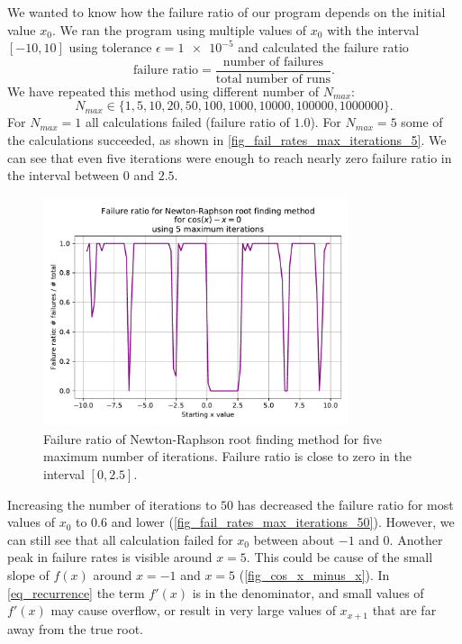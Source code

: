 We wanted to know how the failure ratio of our program depends on the initial value $x_0$. We ran the program using multiple values of $x_0$ with the interval $[-10, 10]$ using tolerance $\epsilon=\num{1e-5}$ and calculated the failure ratio
\[
  \textrm{failure ratio} = \frac{\textrm{number of failures}}{\textrm{total number of runs}}.
\]
We have repeated this method using different number of $N_{max}$:
\[
  N_{max} \in \{1, 5, 10, 20, 50, 100, \num{1000}, \num{10000}, \num{100000}, \num{1000000} \}.
\]
For $N_{max}=1$ all calculations failed (failure ratio of $1.0$). For $N_{max}=5$ some of the calculations succeeded, as shown in \autoref{fig_fail_rates_max_iterations_5}. We can see that even five iterations were enough to reach nearly zero failure ratio in the interval between $0$ and $2.5$.
\begin{figure}[H]
  \centering
  \includegraphics[width=0.8\textwidth]{figures/plot_max_iterations_5.pdf}
  \caption{Failure ratio of Newton-Raphson root finding method for five maximum number of iterations. Failure ratio is close to zero in the interval $[0, 2.5]$.}
  \label{fig_fail_rates_max_iterations_5}
\end{figure}
Increasing the number of iterations to $50$ has decreased the failure ratio for most values of $x_0$ to $0.6$ and lower (\autoref{fig_fail_rates_max_iterations_50}). However, we can still see that all calculation failed for $x_0$ between about $-1$ and $0$. Another peak in failure rates is visible around $x=5$. This could be cause of the small slope of $f(x)$ around $x=-1$ and $x=5$ (\autoref{fig_cos_x_minus_x}). In \autoref{eq_recurrence} the term $f'(x)$ is in the denominator, and small values of $f'(x)$ may cause overflow, or result in very large values of $x_{x+1}$ that are far away from the true root.
